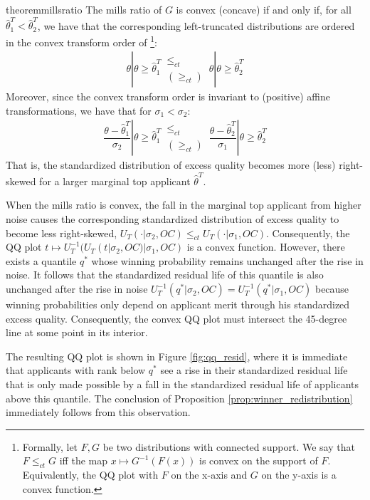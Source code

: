 \documentclass[12pt,reqno]{amsart}
\theoremstyle{definition}
\theoremstyle{plain} %
\begin{document}
\begin{restatable}{theorem}{millsratio}\label{lemma:millsratio_curvature}
The mills ratio of $G$ is convex (concave) if and only if, for all $\hat{\theta}^T_1 < \hat{\theta}^T_2$, we have that the corresponding left-truncated distributions are ordered in the convex transform order of \citet{vanzwet1964convex}\footnote{Formally, let $F,G$ be two distributions with connected support. We say that $F\leq_{ct} G$ iff the map $x\mapsto G^{-1}(F(x))$ is convex on the support of $F$. Equivalently, the QQ plot with $F$ on the x-axis and $G$ on the y-axis is a convex function.}:
\begin{align*}
  \theta | \theta\geq \hat{\theta}_1^T \,\substack{\leq_{ct} \\ (\geq_{ct})}\, \theta| \theta\geq \hat{\theta}_2^T 
\end{align*}
Moreover, since the convex transform order is invariant to (positive) affine transformations, we have that for $\sigma_1<\sigma_2$:
\begin{align*}
  \dfrac{\theta - \hat{\theta}_1^T}{\sigma_2} | \theta\geq \hat{\theta}_1^T \,\substack{\leq_{ct} \\ (\geq_{ct})}\, \dfrac{\theta - \hat{\theta}_2^T}{\sigma_1} | \theta\geq \hat{\theta}_2^T 
\end{align*}
That is, the standardized distribution of excess quality becomes more (less) right-skewed for a larger marginal top applicant $\hat{\theta}^T$. 
\end{restatable}

\noindent When the mills ratio is convex, the fall in the marginal top applicant from higher noise causes the corresponding standardized distribution of excess quality to become less right-skewed, $U_T(\cdot|\sigma_2,OC) \leq_{ct} U_T(\cdot|\sigma_1,OC)$. Consequently, the QQ plot $t\mapsto U_T^{-1}(U_T(t|\sigma_2,OC)|\sigma_1,OC)$ is a convex function. However, there exists a quantile $q^*$ whose winning probability remains unchanged after the rise in noise. It follows that the standardized residual life of this quantile is also unchanged after the rise in noise $U_T^{-1}(q^*|\sigma_2,OC) = U_T^{-1}(q^*|\sigma_1,OC)$ because winning probabilities only depend on applicant merit through his standardized excess quality. Consequently, the convex QQ plot must intersect the 45-degree line at some point in its interior. 

\noindent The resulting QQ plot is shown in Figure \ref{fig:qq_resid}, where it is immediate that applicants with rank below $q^*$ see a rise in their standardized residual life that is only made possible by a fall in the standardized residual life of applicants above this quantile. The conclusion of Proposition \ref{prop:winner_redistribution} immediately follows from this observation. 
\end{document}
